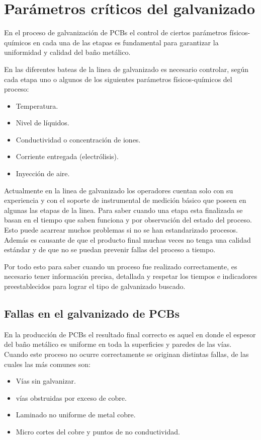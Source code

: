 \section{ Parámetros críticos del galvanizado }

En el proceso de galvanización de PCBs el control de ciertos parámetros físicos-químicos en cada una de las etapas es fundamental para garantizar la uniformidad y calidad del baño metálico. 

En las diferentes bateas de la linea de galvanizado es necesario controlar, según cada etapa uno o algunos de los siguientes parámetros físicos-químicos del proceso:
\begin{itemize}
	\item Temperatura.
	\item Nivel de líquidos.
	\item Conductividad o concentración de iones.
	\item Corriente entregada (electrólisis).
	\item Inyección de aire.
\end{itemize}

Actualmente en la linea de galvanizado los operadores cuentan solo con su experiencia y con el soporte de instrumental de medición básico que poseen en algunas las etapas de la linea. Para saber cuando una etapa esta finalizada se basan en el tiempo que saben funciona y por observación del estado del proceso. Esto puede acarrear muchos problemas si no se han estandarizado procesos. Además es causante de que el producto final muchas veces no tenga una calidad estándar y de que no se puedan prevenir fallas del proceso a tiempo.
 
Por todo esto para saber cuando un proceso fue realizado correctamente, es necesario tener información precisa, detallada y respetar los tiempos e indicadores preestablecidos para lograr el tipo de galvanizado buscado. 

\subsection{ Fallas en el galvanizado de PCBs }

En la producción de PCBs el resultado final correcto es aquel en donde el espesor del baño metálico es uniforme en toda la superficies y paredes de las vías. Cuando este proceso no ocurre correctamente se originan distintas fallas, de las cuales las más comunes son:
\begin{itemize}
	\item Vías sin galvanizar.
	\item vías obstruidas por exceso de cobre.
	\item Laminado no uniforme de metal cobre.
	\item Micro cortes del cobre y puntos de no conductividad.
\end{itemize}

